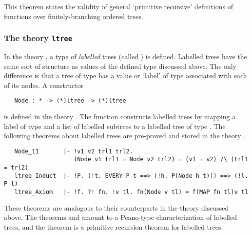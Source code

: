 \noindent This theorem states the validity of general `primitive recursive'
definitions of functions over finitely-branching ordered trees.

\subsubsection{The theory {\tt ltree}}

In the theory , a type of {\it
labelled\/} trees (called ) is defined. Labelled trees have the
same sort of structure as values of the defined type  discussed above.
The only difference is that a tree of type  has a value or `label'
of type \ml{*} associated with each of its nodes.  A constructor

\begin{hol}
\begin{verbatim}
   Node : * -> (*)ltree -> (*)ltree
\end{verbatim}\end{hol}

\noindent is defined in the theory .  The function 
constructs labelled trees by mapping a label of type \ml{*} and a list of
labelled subtrees to a labelled tree of type .
The following theorems
 about labelled trees are pre-proved and stored in the
theory .


\begin{hol}
\begin{verbatim}
   Node_11       |- !v1 v2 trl1 trl2.
                    (Node v1 trl1 = Node v2 trl2) = (v1 = v2) /\ (trl1 = trl2)
   ltree_Induct  |- !P. (!t. EVERY P t ==> (!h. P(Node h t))) ==> (!l. P l)
   ltree_Axiom   |- !f. ?! fn. !v tl. fn(Node v tl) = f(MAP fn tl)v tl
\end{verbatim}\end{hol}

\noindent These  theorems  are  analogous to  their counterparts  in the theory
 discussed  above.    The theorems  
and  amount to a Peano-type characterization of labelled
trees, and the theorem  is a primitive recursion theorem for
labelled trees.

